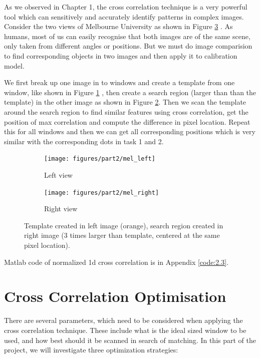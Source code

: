 As we observed in Chapter 1, the cross correlation technique is a very powerful tool which can sensitively and accurately identify patterns in complex images. Consider the two views of Melbourne University as shown in Figure \ref{fig:mel} . As humans, most of us can easily recognise that both images are of the same scene, only taken from different angles or positions. But we must do image comparision to find corresponding objects in two images and then apply it to calibration model.

We first break up one image in to windows and create a template from one window, like shown in Figure \ref{fig:mel_left} , then create a search region (larger than than the template) in the other image as shown in Figure \ref{fig:mel_right}. Then we scan the template around the search region to find similar features using cross correlation,
get the position of max correlation and compute the difference in pixel location. Repeat this for all windows and then we can get all corresponding positions which is very similar with the corresponding dots in task 1 and 2.

\begin{figure}[h!]
	\centering
	\begin{subfigure}[t]{0.48\linewidth}
		\centering
		\texttt{[image: figures/part2/mel\_left]}
		\caption{Left view}
		\label{fig:mel_left}
	\end{subfigure}
	\begin{subfigure}[t]{0.48\linewidth}
		\centering
		\texttt{[image: figures/part2/mel\_right]}
		\caption{Right view}
		\label{fig:mel_right}
	\end{subfigure}
	\caption{Template created in left image (orange), search region created in right image (3 times larger than template, centered at the same pixel location).}
	\label{fig:mel}
\end{figure}

Matlab code of normalized 1d cross correlation is in Appendix \ref{code:2.3}.

\section{Cross Correlation Optimisation}

There are several parameters, which need to be considered when applying the cross correlation technique. These include what is the ideal sized window to be used, and how best should it be scanned in search of matching. In this part of the project, we will investigate three optimization strategies:

